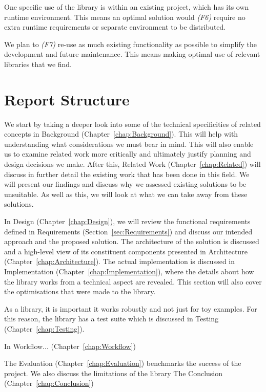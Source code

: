 One specific use of the library is within an existing project, which has its own runtime environment. This means an optimal solution would \emph{(F6)} require no extra runtime requirements or separate environment to be distributed.

We plan to \emph{(F7)} re-use as much existing functionality as possible to simplify the development and future maintenance. This means making optimal use of relevant libraries that we find.

\section{Report Structure}

We start by taking a deeper look into some of the technical specificities of related concepts in Background (Chapter~\ref{chap:Background}). This will help with understanding what considerations we must bear in mind. This will also enable us to examine related work more critically and ultimately justify planning and design decisions we make. After this, Related Work (Chapter~\ref{chap:Related}) will discuss in further detail the existing work that has been done in this field. We will present our findings and discuss why we assessed existing solutions to be unsuitable. As well as this, we will look at what we can take away from these solutions.

In Design (Chapter~\ref{chap:Design}), we will review the functional requirements defined in Requirements (Section~\ref{sec:Requirements}) and discuss our intended approach and the proposed solution. The architecture of the solution is discussed and a high-level view of its constituent components presented in Architecture (Chapter~\ref{chap:Architecture}). The actual implementation is discussed in Implementation (Chapter~\ref{chap:Implementation}), where the details about how the library works from a technical aspect are revealed. This section will also cover the optimisations that were made to the library.

As a library, it is important it works robustly and not just for toy examples. For this reason, the library has a test suite which is discussed in Testing (Chapter~\ref{chap:Testing}).

In Workflow... (Chapter~\ref{chap:Workflow})

The Evaluation (Chapter~\ref{chap:Evaluation}) benchmarks the success of the project. We also discuss the limitations of the library
The Conclusion (Chapter~\ref{chap:Conclusion}) 